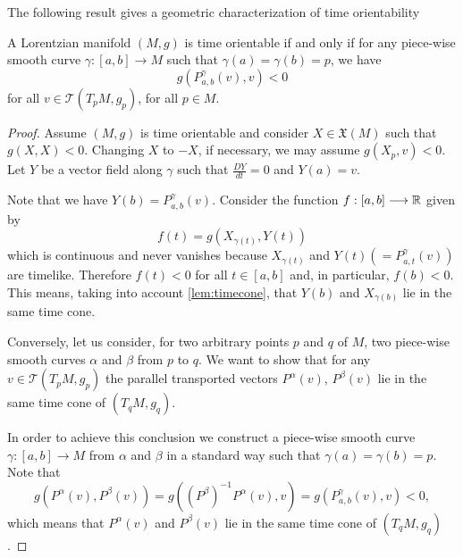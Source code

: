 

The following result gives a geometric characterization of time orientability \cite[p. 255]{sachs77}


\begin{corollary}\label{parallel_transport}

    A Lorentzian manifold $(M,g)$ is time orientable if and only if for any piece-wise smooth curve $\gamma : [a,b] \longrightarrow M$ such that $\gamma(a)=\gamma(b)=p$, we have
    \[
    g(P_{a,b}^{\gamma}(v),v)<0
    \]
    for all $v\in \mathcal{T}(T_pM,g_p)$, for all $p \in M$.

\end{corollary}

\begin{proof}
    Assume $(M,g)$ is time orientable and consider $X \in \mathfrak{X}(M)$ such that $g(X,X)<0$. Changing $X$ to $-X$, if necessary, we may assume $g(X_p,v)<0$. Let $Y$ be a vector field along $\gamma$ such that $\frac{DY}{dt}=0$ and $Y(a)=v$.

    Note that we have $Y(b)=P_{a,b}^{\gamma}(v)$. Consider the function $f : [a,b] \longrightarrow \mathbb{R}$ given by
    \[
        f(t)= g(X_{\gamma(t)},Y(t))
    \]
    which is continuous and never vanishes because $X_{\gamma(t)}$ and $Y(t)(=P_{a,t}^{\gamma}(v))$ are timelike. Therefore $f(t)<0$ for all $t\in [a,b]$ and, in particular, $f(b)<0$. This means, taking into account \autoref{lem:timecone}, that $Y(b)$ and $X_{\gamma(b)}$ lie in the same time cone.

    Conversely, let us consider, for two arbitrary points $p$ and $q$ of $M$, two piece-wise smooth curves $\alpha$ and $\beta$ from $p$ to $q$. We want to show that for any $v\in \mathcal{T}(T_pM,g_p)$ the parallel transported vectors $P^{\alpha}(v)$, $P^{\beta}(v)$ lie in the same time cone of $(T_qM,g_q)$.

    In order to achieve this conclusion we construct a piece-wise smooth curve $\gamma : [a,b] \longrightarrow M$ from $\alpha$ and $\beta$ in a standard way such that $\gamma(a)=\gamma(b)=p$. Note that $$g(P^{\alpha}(v),P^{\beta}(v))=g((P^{\beta})^{-1}P^{\alpha}(v),v)=g(P_{a,b}^{\gamma}(v),v)<0,$$ which means that $P^{\alpha}(v)$ and $P^{\beta}(v)$ lie in the same time cone of $(T_qM,g_q)$.


\end{proof}
